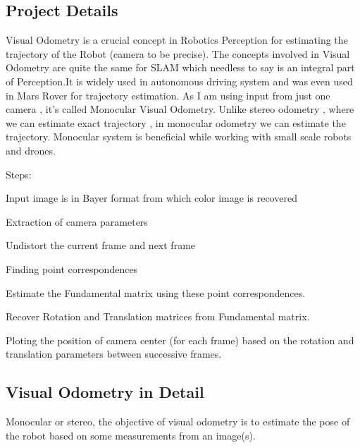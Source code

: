 \href{https://travis-ci.org/bhargavipatel/808X_VO}{\tt } \href{https://coveralls.io/github/bhargavipatel/808X_VO?branch=master}{\tt } \subsection*{\href{https://github.com/bhargavipatel/808X_VO/blob/master/LICENSE}{\tt } }

\subsection*{Project Details}

Visual Odometry is a crucial concept in Robotics Perception for estimating the trajectory of the Robot (camera to be precise). The concepts involved in Visual Odometry are quite the same for S\+L\+AM which needless to say is an integral part of Perception.\+It is widely used in autonomous driving system and was even used in Mars Rover for trajectory estimation. As I am using input from just one camera , it’s called Monocular Visual Odometry. Unlike stereo odometry , where we can estimate exact trajectory , in monocular odometry we can estimate the trajectory. Monocular system is beneficial while working with small scale robots and drones.

Steps\+:
\begin{DoxyItemize}
\item Input image is in Bayer format from which color image is recovered
\item Extraction of camera parameters
\item Undistort the current frame and next frame
\item Finding point correspondences
\item Estimate the Fundamental matrix using these point correspondences.
\item Recover Rotation and Translation matrices from Fundamental matrix.
\item Ploting the position of camera center (for each frame) based on the rotation and translation parameters between successive frames.
\end{DoxyItemize}

\subsection*{Visual Odometry in Detail}

Monocular or stereo, the objective of visual odometry is to estimate the pose of the robot based on some measurements from an image(s).

